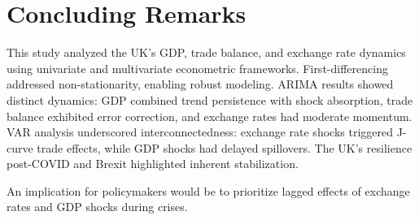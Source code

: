 \documentclass[
]{article}
\begin{document}
	
		
	
	
	
	
		
	
	
	
	
		
	
	
	\section{Concluding Remarks}
	This study analyzed the UK’s GDP, trade balance, and exchange rate dynamics using univariate and multivariate econometric frameworks. 
	First-differencing addressed non-stationarity, enabling robust modeling. ARIMA results showed distinct dynamics:
	GDP combined trend persistence with shock absorption, trade balance exhibited error correction, and exchange rates had moderate momentum.
	VAR analysis underscored interconnectedness: exchange rate shocks triggered
	J-curve trade effects, while GDP shocks had delayed spillovers. 
	The UK’s resilience post-COVID and Brexit highlighted inherent stabilization.
	
	An implication for policymakers would be to prioritize lagged effects of exchange rates and GDP shocks during crises.
	
\end{document}
